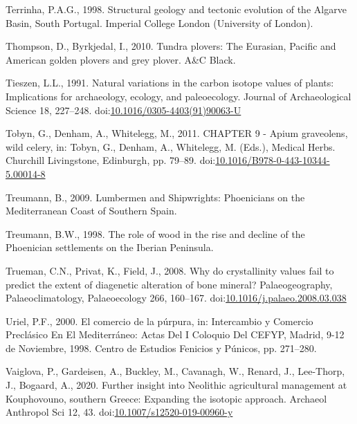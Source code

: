 \documentclass[review]{elsarticle} %
\newlength{\cslhangindent}
\newenvironment{CSLReferences}[2] %
 {%
  \setlength{\parindent}{0pt}
  \ifodd #1 \everypar{\setlength{\hangindent}{\cslhangindent}}\ignorespaces\fi
  \ifnum #2 > 0
  \setlength{\parskip}{#2\baselineskip}
  \fi
 }%
 {}
\begin{document}
\begin{CSLReferences}{1}{0}
\leavevmode{}%
Terrinha, P.A.G., 1998. Structural geology and tectonic evolution of the {Algarve Basin}, {South Portugal}. {Imperial College London (University of London)}.

\leavevmode{}%
Thompson, D., Byrkjedal, I., 2010. Tundra plovers: The {Eurasian}, {Pacific} and {American} golden plovers and grey plover. {A\&C Black}.

\leavevmode{}%
Tieszen, L.L., 1991. Natural variations in the carbon isotope values of plants: {Implications} for archaeology, ecology, and paleoecology. Journal of Archaeological Science 18, 227--248. doi:\href{https://doi.org/10.1016/0305-4403(91)90063-U}{10.1016/0305-4403(91)90063-U}

\leavevmode{}%
Tobyn, G., Denham, A., Whitelegg, M., 2011. {CHAPTER} 9 - {Apium} graveolens, wild celery, in: Tobyn, G., Denham, A., Whitelegg, M. (Eds.), Medical {Herbs}. {Churchill Livingstone}, {Edinburgh}, pp. 79--89. doi:\href{https://doi.org/10.1016/B978-0-443-10344-5.00014-8}{10.1016/B978-0-443-10344-5.00014-8}

\leavevmode{}%
Treumann, B., 2009. Lumbermen and {Shipwrights}: {Phoenicians} on the {Mediterranean Coast} of {Southern Spain}.

\leavevmode{}%
Treumann, B.W., 1998. The role of wood in the rise and decline of the {Phoenician} settlements on the {Iberian Peninsula}.

\leavevmode{}%
Trueman, C.N., Privat, K., Field, J., 2008. Why do crystallinity values fail to predict the extent of diagenetic alteration of bone mineral? Palaeogeography, Palaeoclimatology, Palaeoecology 266, 160--167. doi:\href{https://doi.org/10.1016/j.palaeo.2008.03.038}{10.1016/j.palaeo.2008.03.038}

\leavevmode{}%
Uriel, P.F., 2000. El comercio de la púrpura, in: Intercambio y Comercio Preclásico En El {Mediterráneo}: Actas Del {I} Coloquio Del {CEFYP}, {Madrid}, 9-12 de Noviembre, 1998. {Centro de Estudios Fenicios y Púnicos}, pp. 271--280.

\leavevmode{}%
Vaiglova, P., Gardeisen, A., Buckley, M., Cavanagh, W., Renard, J., Lee-Thorp, J., Bogaard, A., 2020. Further insight into {Neolithic} agricultural management at {Kouphovouno}, southern {Greece}: Expanding the isotopic approach. Archaeol Anthropol Sci 12, 43. doi:\href{https://doi.org/10.1007/s12520-019-00960-y}{10.1007/s12520-019-00960-y}


\end{CSLReferences}
\end{document}
